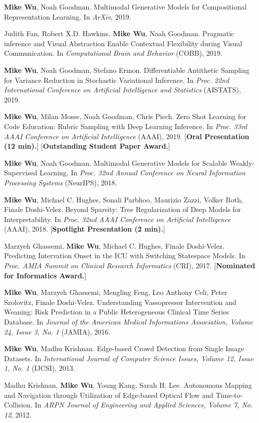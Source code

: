 \documentclass[margin, 10pt]{res} %
\begin{document}
\begin{resume}
\textbf{Mike Wu}, Noah Goodman. Multimodal Generative Models for Compositional Representation Learning. In \textit{ArXiv}, 2019.

Judith Fan, Robert X.D. Hawkins, \textbf{Mike Wu}, Noah Goodman. Pragmatic inference and Visual Abstraction Enable Contextual Flexibility during Visual Communication. In \textit{Computational Brain and Behavior} (COBB), 2019.

\textbf{Mike Wu}, Noah Goodman, Stefano Ermon. Differentiable Antithetic Sampling for Variance Reduction in Stochastic Variational Inference. In \textit{Proc. 22nd International Conference on Artificial Intelligence and Statistics} (AISTATS), 2019.

\textbf{Mike Wu}, Milan Mosse, Noah Goodman, Chris Piech. Zero Shot Learning for Code Education: Rubric Sampling with Deep Learning Inference. In \textit{Proc. 33rd AAAI Conference on Artificial Intelligence} (AAAI), 2019. [\textbf{Oral Presentation (12 min).}] [\textbf{Outstanding Student Paper Award.}]

\textbf{Mike Wu}, Noah Goodman. Multimodal Generative Models for Scalable Weakly-Supervised Learning. In \textit{Proc. 32nd Annual Conference on Neural Information Processing Systems} (NeurIPS), 2018.

\textbf{Mike Wu}, Michael C. Hughes, Sonali Parbhoo, Maurizio Zazzi, Volker Roth, Finale Doshi-Velez. Beyond Sparsity: Tree Regularization of Deep Models for Interpretability. In \textit{Proc. 32nd AAAI Conference on Artificial Intelligence} (AAAI), 2018. [\textbf{Spotlight Presentation (2 min).}]

Marzyeh Ghassemi, \textbf{Mike Wu}, Michael C. Hughes, Finale Doshi-Velez. Predicting Intervation Onset in the ICU with Switching Statespace Models. In \textit{Proc. AMIA Summit on Clinical Research Informatics} (CRI), 2017. [\textbf{Nominated for Informatics Award.}]

\textbf{Mike Wu}, Marzyeh Ghassemi, Mengling Feng, Leo Anthony Celi, Peter Szolovitz, Finale Doshi-Velez. Understanding Vassopressor Intervention and Weaning: Risk Prediction in a Public Heterogeneous Clinical Time Series Database. In \textit{Journal of the American Medical Informations Association, Volume 24, Issue 3, No. 1} (JAMIA), 2016.

\textbf{Mike Wu}, Madhu Krishnan. Edge-based Crowd Detection from Single Image Datasets. In \textit{International Journal of Computer Science Issues, Volume 12, Issue 1, No. 1} (IJCSI), 2013.

Madhu Krishnan, \textbf{Mike Wu}, Young Kang, Sarah H. Lee. Autonomous Mapping and Navigation through Utilization of Edge-based Optical Flow and Time-to-Collision. In \textit{ARPN Journal of Engineering and Applied Sciences, Volume 7, No. 12}, 2012.


\end{resume}
\end{document}
